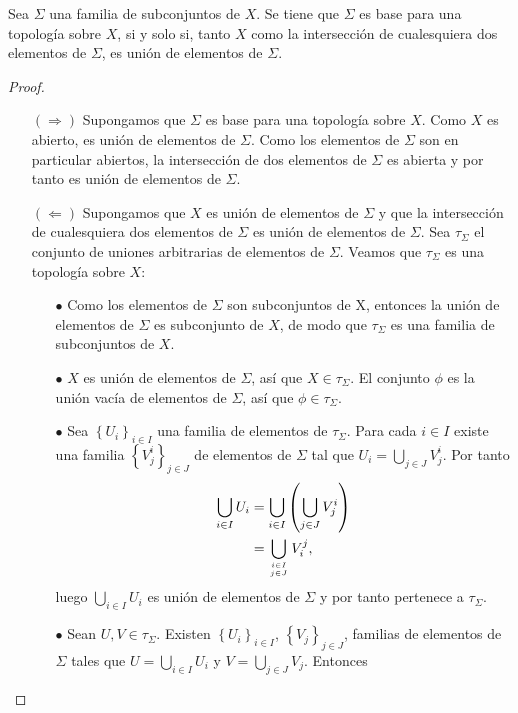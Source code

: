 \begin{Prop}\label{Prop:ConjuntoEsBase}
   Sea $\Sigma$ una familia de subconjuntos de $X$. Se tiene que $\Sigma$ es base para una topología sobre $X$, si y solo si, tanto $X$ como la intersección de cualesquiera dos elementos de $\Sigma$, es unión de elementos de $\Sigma$.
\end{Prop}
\begin{proof}
   \begin{itemize}
      \item[$(\Rightarrow)$] Supongamos que $\Sigma$ es base para una topología sobre $X$. Como $X$ es abierto, es unión de elementos de $\Sigma$. Como los elementos de $\Sigma$ son en particular abiertos, la intersección de dos elementos de $\Sigma$ es abierta y por tanto es unión de elementos de $\Sigma$.
      \item[$(\Leftarrow)$] Supongamos que $X$ es unión de elementos de $\Sigma$ y que la intersección de cualesquiera dos elementos de $\Sigma$ es unión de elementos de $\Sigma$. Sea $\tau_\Sigma$ el conjunto de uniones arbitrarias de elementos de $\Sigma$. Veamos que $\tau_\Sigma$ es una topología sobre $X$:
         \begin{itemize}
            \item[$\bullet$] Como los elementos de $\Sigma$ son subconjuntos de X, entonces la unión de elementos de $\Sigma$ es subconjunto de $X$, de modo que $\tau_\Sigma$ es una familia de subconjuntos de $X$.
            \item[$\bullet$] $X$ es unión de elementos de $\Sigma$, así que $X\in\tau_\Sigma$. El conjunto $\phi$ es la unión vacía de elementos de $\Sigma$, así que $\phi\in \tau_\Sigma$.
            \item[$\bullet$] Sea $\left\lbrace U_i\right\rbrace_{i\in I}$ una familia de elementos de $\tau_\Sigma$. Para cada $i\in I$ existe una familia $\left\lbrace V^{i}_{j}\right\rbrace_{j\in J}$ de elementos de $\Sigma$ tal que $U_i=\bigcup_{j\in J}V^{i}_{j}$. Por tanto 
               $$
               \begin{aligned}
                  \bigcup_{i\in I}U_i&=\bigcup_{i\in I}\left( \bigcup_{j\in J}V^{i}_{j}\right)\\
                                     &=\bigcup_{{i\in I}\atop {j\in J}}V^{j}_{i},
               \end{aligned}
               $$
               luego $\bigcup_{i\in I}U_i$ es unión de elementos de $\Sigma$ y por tanto pertenece a $\tau_\Sigma$.
            \item[$\bullet$] Sean $U,V\in \tau_\Sigma$. Existen $\left\lbrace U_i\right\rbrace_{i\in I}$, $\left\lbrace V_j\right\rbrace_{j\in J}$, familias de elementos de $\Sigma$ tales que $U=\bigcup_{i\in I}U_i$ y $V=\bigcup_{j\in J}V_j$. Entonces

\end{itemize}
\end{itemize}
\end{proof}
